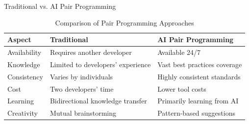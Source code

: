 \documentclass{beamer}
\begin{document}
\begin{frame}[t]{Traditional vs. AI Pair Programming}
    \begin{table}
        \centering
        \begin{tabular}{p{}|p{}|p{}}
            \textbf{Aspect} & \textbf{Traditional} & \textbf{AI Pair Programming} \\
            \hline
            Availability & Requires another developer & Available 24/7 \\
            Knowledge & Limited to developers' experience & Vast best practices coverage \\
            Consistency & Varies by individuals & Highly consistent standards \\
            Cost & Two developers' time & Lower tool costs \\
            Learning & Bidirectional knowledge transfer & Primarily learning from AI \\
            Creativity & Mutual brainstorming & Pattern-based suggestions \\
        \end{tabular}
        \caption{Comparison of Pair Programming Approaches}
    \end{table}
\end{frame}
\end{document}
